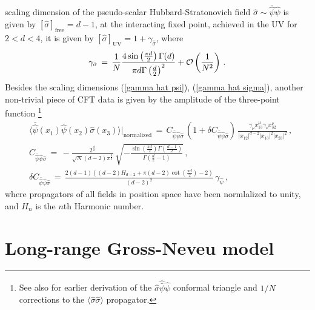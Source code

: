 \documentclass[aps,amsmath,amssymb,prd,showpacs,floatfix,preprint,superscriptaddress,nofootinbib,12pt]{article}
\begin{document}
scaling dimension of the pseudo-scalar Hubbard-Stratonovich field $\hat\sigma\sim \bar{\hat\psi}\hat\psi$ 
is given by $[\hat\sigma]_{\textrm{free}} = d-1$, at the interacting fixed point, achieved in the UV
for $2<d<4$, it is given by $[\hat\sigma]_{\textrm{UV}} = 1 + \gamma_{\hat\sigma}$, where \cite{Zinn-Justin:1991ksq}
\begin{equation}
\label{gamma hat sigma}
\gamma_{\hat\sigma} \,=\, \frac{1}{N}\frac{4 \sin \left(\frac{\pi  d}{2}\right) \Gamma (d)}{\pi  d \Gamma \left(\frac{d}{2}\right)^2}
+{\cal O}\left(\frac{1}{N^2}\right)\,.
\end{equation}
Besides the scaling dimensions (\ref{gamma hat psi}), (\ref{gamma hat sigma}),
another non-trivial piece of CFT data is given by the amplitude of the 
three-point function \cite{Goykhman:2020ffn}\footnote{See also \cite{Manashov:2017rrx}
for earlier derivation of the $\hat\sigma\hat{\bar\psi}\hat\psi$ conformal triangle and $1/N$
corrections to the $\langle\hat\sigma\hat\sigma\rangle$ propagator.}
\begin{equation}
\label{psi psi s GN}
\begin{aligned}
&\langle \bar{\hat\psi}(x_1)\hat\psi(x_2) \hat\sigma(x_3)\rangle\Bigg|_{\textrm{normalized}} \,=\, 
C_{\bar{\hat\psi}\hat\psi \hat\sigma}\,(1+\delta C_{\bar{\hat\psi}\hat\psi \hat\sigma})\,\frac{\gamma_\mu x_{13}^\mu
\gamma_\nu x_{32}^\nu}{|x_{12}|^{d-2}|x_{13}|^{2}|x_{23}|^{2}}\,,\\
&C_{\bar{\hat\psi}\hat\psi\hat \sigma}\,=\,-\frac{2^\frac{d}{2}}{\sqrt{N}(d-2)\pi^\frac{3}{4}}\,
\sqrt{-\frac{\sin \left(\frac{\pi  d}{2}\right) \Gamma \left(\frac{d-1}{2}\right)}{\Gamma \left(\frac{d}{2}-1\right)}}\,,\\
&\delta C_{\bar{\hat\psi}\hat\psi\hat \sigma}\,
=\,\frac{2 (d-1) \left((d-2) H_{d-2}+\pi  (d-2) \cot \left(\frac{\pi  d}{2}\right)-2\right)}{(d-2)^2}\,
\gamma_{\hat\psi}\,,
\end{aligned}
\end{equation}
where propagators of all fields in position space have been normlalized to unity, and $H_n$ is the $n$th
Harmonic number.


\section{Long-range Gross-Neveu model}
\label{sec:LR GN}
\end{document}
